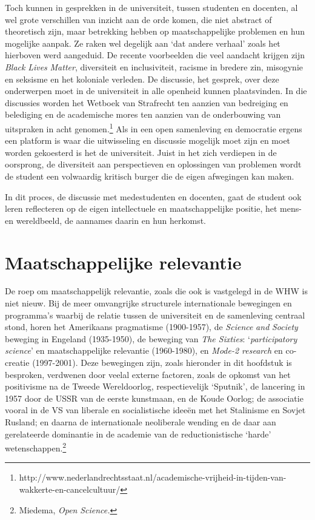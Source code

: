 \documentclass[smallauthor, chapterhaspagenum, nochapterinheader, pagenuminheader,  bigchapnum,medium2, tocpages,  garamond, titleinheader]{jote-book}
\begin{document}
	Toch kunnen in gesprekken in de universiteit, tussen studenten en docenten, al wel grote verschillen van inzicht aan de orde komen, die niet abstract of theoretisch zijn, maar betrekking hebben op maatschappelijke problemen en hun mogelijke aanpak. Ze raken wel degelijk aan ‘dat andere verhaal' zoals het hierboven werd aangeduid. De recente voorbeelden die veel aandacht krijgen zijn \emph{Black }\emph{Lives}\emph{ Matter}, diversiteit en inclusiviteit, racisme in bredere zin, misogynie en seksisme en het koloniale verleden. De discussie, het gesprek, over deze onderwerpen moet in de universiteit in alle openheid kunnen plaatsvinden. In die discussies worden het Wetboek van Strafrecht ten aanzien van bedreiging en belediging en de academische mores ten aanzien van de onderbouwing van uitspraken in acht genomen.\footnote{http://www.nederlandrechtsstaat.nl/academische-vrijheid-in-tijden-van-wakkerte-en-cancelcultuur/} Als in een open samenleving en democratie ergens een platform is waar die uitwisseling en discussie mogelijk moet zijn en moet worden gekoesterd is het de universiteit. Juist in het zich verdiepen in de oorsprong, de diversiteit aan perspectieven en oplossingen van problemen wordt de student een volwaardig kritisch burger die de eigen afwegingen kan maken.



	In dit proces, de discussie met medestudenten en docenten, gaat de student ook leren reflecteren op de eigen intellectuele en maatschappelijke positie, het mens- en wereldbeeld, de aannames daarin en hun herkomst.



	\section{Maatschappelijke relevantie}



	De roep om maatschappelijk relevantie, zoals die ook is vastgelegd in de WHW is niet nieuw. Bij de meer omvangrijke structurele internationale bewegingen en programma's waarbij de relatie tussen de universiteit en de samenleving centraal stond, horen het Amerikaans pragmatisme (1900-1957), de \emph{Science}\emph{ }\emph{and}\emph{ Society} beweging in Engeland (1935-1950), de beweging van \emph{The Sixties}: ‘\emph{participatory}\emph{ }\emph{science}' en maatschappelijke relevantie (1960-1980), en \emph{Mode}\emph{-}\emph{2 research} en co-creatie (1997-2001). Deze bewegingen zijn, zoals hieronder in dit hoofdstuk is besproken, verdwenen door veelal externe factoren, zoals de opkomst van het positivisme na de Tweede Wereldoorlog, respectievelijk ‘Sputnik', de lancering in 1957 door de USSR van de eerste kunstmaan, en de Koude Oorlog; de associatie vooral in de VS van liberale en socialistische ideeën met het Stalinisme en Sovjet Rusland; en daarna de internationale neoliberale wending en de daar aan gerelateerde dominantie in de academie van de reductionistische ‘harde' wetenschappen.\footnote{Miedema, \emph{Open }\emph{Science}\emph{.}}
\end{document}
